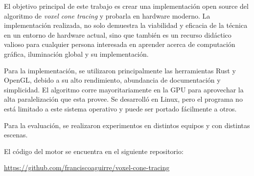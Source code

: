 \documentclass{prgrado}
\begin{document}
El objetivo principal de este trabajo es crear una implementación open source del algoritmo de \textit{voxel cone tracing} y probarla en hardware moderno.
La implementación realizada, no solo demuestra la viabilidad y eficacia de la técnica en un entorno de hardware actual, sino que también es un recurso didáctico valioso para cualquier persona interesada en aprender acerca de computación gráfica, iluminación global y su implementación.

Para la implementación, se utilizaron principalmente las herramientas Rust y OpenGL, debido a su alto rendimiento, abundancia de documentación y simplicidad.
El algoritmo corre mayoritariamente en la GPU para aprovechar la alta paralelización que esta provee.
Se desarrolló en Linux, pero el programa no está limitado a este sistema operativo y puede ser portado fácilmente a otros.

Para la evaluación, se realizaron experimentos en distintos equipos y con distintas escenas.

El código del motor se encuentra en el siguiente repositorio:

\url{https://github.com/franciscoaguirre/voxel-cone-tracing}

\hfill \break
{}


\tableofcontents
\newpage



\mainmatter %













\backmatter %


\newpage

\printbibliography



\begin{appendix}



\end{appendix}

\end{document}
